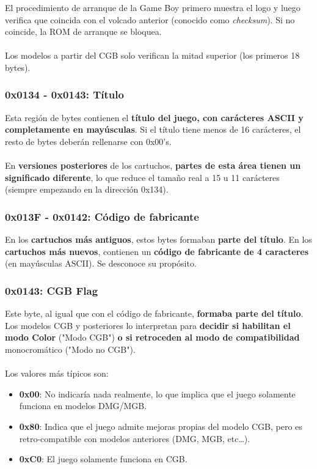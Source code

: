 El procedimiento de arranque de la Game Boy primero muestra el logo y luego verifica que coincida con el volcado anterior (conocido como \textit{checksum}). Si no coincide, la ROM de arranque se bloquea.
\\\\
Los modelos a partir del CGB solo verifican la mitad superior (los primeros 18 bytes).

\subsubsection{0x0134 - 0x0143: Título}
Esta región de bytes contienen el \textbf{título del juego, con carácteres ASCII y completamente en mayúsculas}. Si el título tiene menos de 16 carácteres, el resto de bytes deberán rellenarse con 0x00's.
\\\\
En \textbf{versiones posteriores} de los cartuchos, \textbf{partes de esta área tienen un significado diferente}, lo que reduce el tamaño real a 15 u 11 carácteres (siempre empezando en la dirección 0x134).

\subsubsection{0x013F - 0x0142: Código de fabricante}

En los \textbf{cartuchos más antiguos}, estos bytes formaban \textbf{parte del título}. En los \textbf{cartuchos más nuevos}, contienen un \textbf{código de fabricante de 4 caracteres} (en mayúsculas ASCII). Se desconoce su propósito.

\subsubsection{0x0143: CGB Flag}
Este byte, al igual que con el código de fabricante, \textbf{formaba parte del título}. Los modelos CGB y posteriores lo interpretan para \textbf{decidir si habilitan el modo Color} ("Modo CGB") \textbf{o si retroceden al modo de compatibilidad} monocromático ("Modo no CGB").
\\\\
Los valores más típicos son: 
\begin{itemize}
    \item \textbf{0x00}: No indicaría nada realmente, lo que implica que el juego solamente funciona en modelos DMG/MGB.
    \item \textbf{0x80}: Indica que el juego admite mejoras propias del modelo CGB, pero es retro-compatible con modelos anteriores (DMG, MGB, etc\ldots).
    \item \textbf{0xC0}: El juego solamente funciona en CGB.
\end{itemize}

